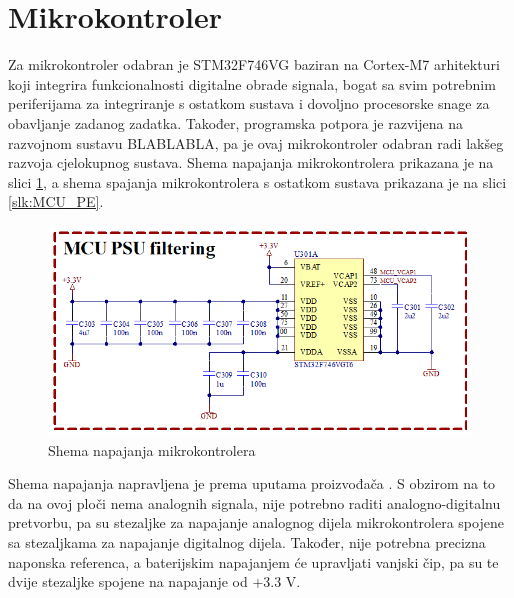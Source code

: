 \section{Mikrokontroler}
Za mikrokontroler odabran je STM32F746VG baziran na Cortex-M7 arhitekturi koji integrira funkcionalnosti digitalne obrade signala, bogat sa svim potrebnim periferijama za integriranje s ostatkom sustava i dovoljno procesorske snage za obavljanje zadanog zadatka. Također, programska potpora je razvijena na razvojnom sustavu BLABLABLA, pa je ovaj mikrokontroler odabran radi lakšeg razvoja cjelokupnog sustava. Shema napajanja mikrokontrolera prikazana je na slici \ref{slk:MCU_PS}, a shema spajanja mikrokontrolera s ostatkom sustava prikazana je na slici \ref{slk:MCU_PE}.

\begin{figure}[hbt]
    \centering
    \includegraphics[width=\textwidth]{Figures/MCU_02.png}
    \caption{Shema napajanja mikrokontrolera}
    \label{slk:MCU_PS}
\end{figure}

Shema napajanja napravljena je prema uputama proizvođača \cite{stmicroelectronics:an4661}. S obzirom na to da na ovoj ploči nema analognih signala, nije potrebno raditi analogno-digitalnu pretvorbu, pa su stezaljke za napajanje analognog dijela mikrokontrolera spojene sa stezaljkama za napajanje digitalnog dijela. Također, nije potrebna precizna naponska referenca, a baterijskim napajanjem će upravljati vanjski čip, pa su te dvije stezaljke spojene na napajanje od +3.3 V.
\newpage

